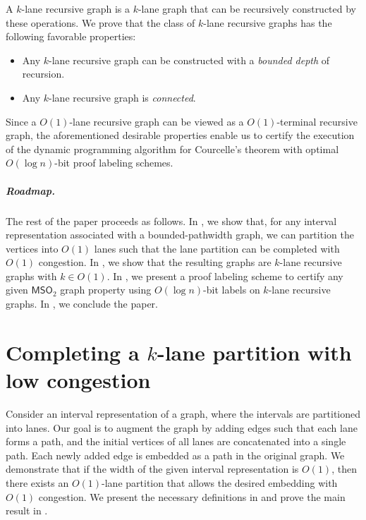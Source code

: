 \documentclass[11pt]{article}
\theoremstyle{definition}
\theoremstyle{remark}
\newcommand{\MSO}{\mathsf{MSO}_2}
\begin{document}
A $k$-lane recursive graph is a $k$-lane graph that can be recursively constructed by these operations. We prove that the class of $k$-lane recursive graphs has the following favorable properties: 
\begin{itemize}
    \item Any $k$-lane recursive graph can be constructed with a \emph{bounded depth} of recursion. 
    \item Any $k$-lane recursive graph is \emph{connected}.
\end{itemize}
Since a $O(1)$-lane recursive graph can be viewed as a $O(1)$-terminal recursive graph, the aforementioned desirable properties enable us to certify the execution of the dynamic programming algorithm for Courcelle's theorem with optimal $O(\log n)$-bit proof labeling schemes.


\subparagraph{Roadmap.}
The rest of the paper proceeds as follows. 
In , we show that, for any interval representation associated with a bounded-pathwidth graph, we can partition the vertices into $O(1)$ lanes such that the lane partition can be completed with $O(1)$ congestion.
In , we show that the resulting graphs are $k$-lane recursive graphs with $k \in O(1)$.
In , we present a proof labeling scheme to certify any given $\MSO$ graph property using $O(\log n)$-bit labels on $k$-lane recursive graphs.
In , we conclude the paper.
 




\section{Completing a \texorpdfstring{$k$}{k}-lane partition with low congestion}\label{sect:lane-decomposition}

Consider an interval representation of a graph, where the intervals are partitioned into lanes.
Our goal is to augment the graph by adding edges such that each lane forms a path, and the initial vertices of all lanes are concatenated into a single path. Each newly added edge is embedded as a path in the original graph. 
We demonstrate that if the width of the given interval representation is $O(1)$, then there exists an $O(1)$-lane partition that allows the desired embedding with $O(1)$ congestion.
We present the necessary definitions in  and prove the main result in .
\end{document}
